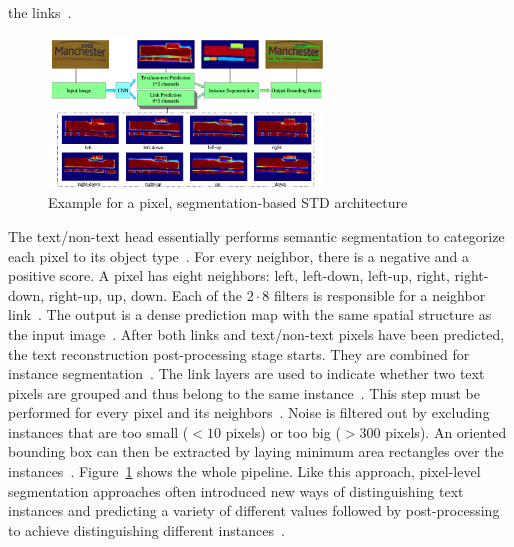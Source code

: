 the links~\citep{deng_pixellink_2018}.
\begin{figure}[ht]
    \centering
    \includegraphics[width=0.65\textwidth]{img/STD-seg-based-architecture-Deng-PixelLink-2018.png}
    \caption[Pixel, segmentation-based STD architecture]{%
        Example for a pixel, segmentation-based STD
        architecture~\citep{deng_pixellink_2018}\label{fig:STD-segbased-pixel-architecture}
    }
\end{figure}
The text/non-text head essentially performs semantic segmentation to categorize each
pixel to its object type~\citep{deng_pixellink_2018}.
For every neighbor, there is a negative and a positive score.
A pixel has eight neighbors: left, left-down, left-up, right, right-down, right-up, up, down.
Each of the $2\cdot8$ filters is responsible for a neighbor link~\citep{deng_pixellink_2018}.
The output is a dense prediction map with the same spatial structure as the input
image~\citep{deng_pixellink_2018}.
After both links and text/non-text pixels have been predicted, the text reconstruction
post-processing stage starts.
They are combined for instance segmentation~\citep{deng_pixellink_2018}.
The link layers are used to indicate whether two text pixels are grouped and thus belong to
the same instance~\citep{deng_pixellink_2018}.
This step must be performed for every pixel and its neighbors~\citep{deng_pixellink_2018}.
Noise is filtered out by excluding instances that are too small ($<10$ pixels) or too big ($>300$
pixels).
An oriented bounding box can then be extracted by laying minimum area rectangles over the
instances~\citep{deng_pixellink_2018}.
Figure~\ref{fig:STD-segbased-pixel-architecture} shows the whole pipeline.
Like this approach, pixel-level segmentation approaches often introduced new ways of
distinguishing text instances and predicting a variety of different values followed by
post-processing to achieve distinguishing different
instances~\citep{deng_pixellink_2018,liao_real-time_2019,ferrari_textsnake_2018}.

